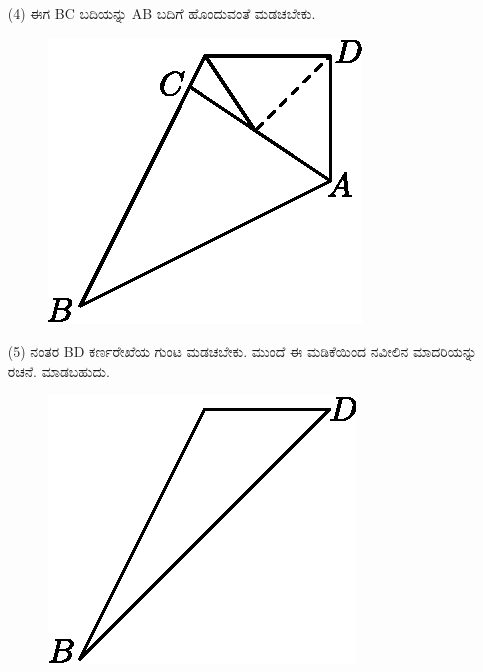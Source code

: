 \begin{itemize}
\item[(4)] ಈಗ BC ಬದಿಯನ್ನು AB ಬದಿಗೆ ಹೊಂದುವಂತೆ ಮಡಚಬೇಕು. 
\begin{figure}[H]
\centering
\includegraphics[scale=.98]{src/figure/chap1/fig1-10d.eps}
\end{figure}

\item[(5)] ನಂತರ BD ಕರ್ಣರೇಖೆಯ ಗುಂಟ ಮಡಚಬೇಕು. ಮುಂದೆ ಈ ಮಡಿಕೆಯಿಂದ ನವೀಲಿನ ಮಾದರಿಯನ್ನು ರಚನೆ. ಮಾಡಬಹುದು. 
\begin{figure}[H]
\centering
\includegraphics[scale=.98]{src/figure/chap1/fig1-10e.eps}
\end{figure}


\end{itemize}

